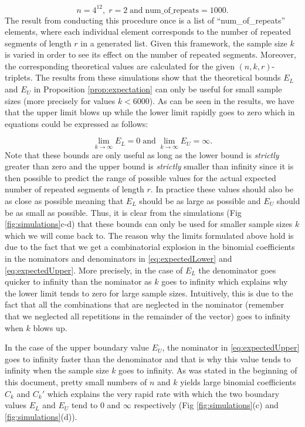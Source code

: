 \documentclass{article}
\begin{document}
$$n=4^{12},\;r=2\;\textrm{and}\;\textrm{num\_of\_repeats}=1000.$$
The result from conducting this procedure once is a list of ``num\_of\_repeats'' elements, where each individual element corresponds to the number of repeated segments of length $r$ in a generated list. Given this framework, the sample size $k$ is varied in order to see its effect on the number of repeated segments. Moreover, the corresponding theoretical values are calculated for the given $(n,k,r)$-triplets. The results from these simulations show that the theoretical bounds $E_{L}$ and $E_U$ in Proposition \ref{prop:expectation} can only be useful for small sample sizes (more precisely for values $k<6000$). As can be seen in the results, we have that the upper limit blows up while the lower limit rapidly goes to zero which in equations could be expressed as follows:

$$\underset{k\rightarrow\infty}{\lim}E_L=0\;\mathrm{and}\;\underset{k\rightarrow\infty}{\lim}E_U=\infty.$$
Note that these bounds are only useful as long as the lower bound is \textit{strictly} greater than zero and the upper bound is \textit{strictly} smaller than infinity since it is then possible to predict the range of possible values for the actual expected number of repeated segments of length $r$. In practice these values should also be as close as possible meaning that $E_L$ should be as large as possible and $E_U$ should be as small as possible. Thus, it is clear from the simulations (Fig \ref{fig:simulations}c-d) that these bounds can only be used for smaller sample sizes $k$ which we will come back to. The reason why the limits formulated above hold is due to the fact that we get a combinatorial explosion in the binomial coefficients in the nominators and denominators in \eqref{eq:expectedLower} and \eqref{eq:expectedUpper}. More precisely, in the case of $E_L$ the denominator goes quicker to infinity than the nominator as $k$ goes to infinity which explains why the lower limit tends to zero for large sample sizes. Intuitively, this is due to the fact that all the combinations that are neglected in the nominator (remember that we neglected all repetitions in the remainder of the vector) goes to infinity when $k$ blows up.

In the case of the upper boundary value $E_U$, the nominator in \eqref{eq:expectedUpper} goes to infinity faster than the denominator and that is why this value tends to infinity when the sample size $k$ goes to infinity. As was stated in the beginning of this document, pretty small numbers of $n$ and $k$ yields large binomial coefficients $C_k$ and $C_k'$ which explains the very rapid rate with which the two boundary values $E_L$ and $E_U$ tend to $0$ and $\infty$ respectively (Fig \ref{fig:simulations}(c) and \ref{fig:simulations}(d)).
\end{document}
